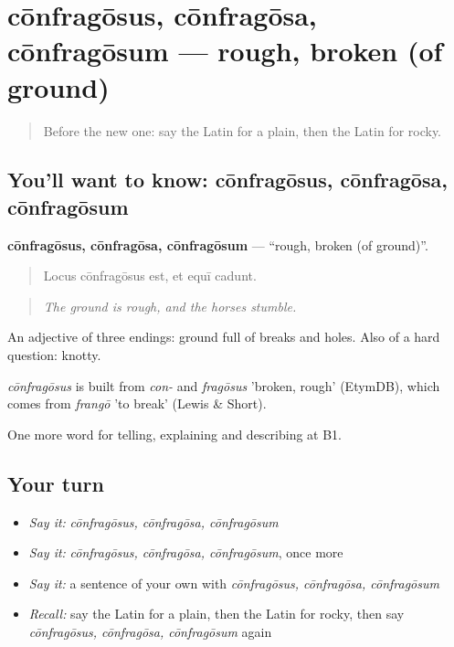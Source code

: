 \section[cōnfragōsus, cōnfragōsa, cōnfragōsum]{cōnfragōsus, cōnfragōsa, cōnfragōsum — rough, broken (of ground)}

\label{lesson:LA-C481-confragosus}



\begin{quote}
Before the new one: say the Latin for a plain, then the Latin for rocky.
\end{quote}

\subsection*{You'll want to know: cōnfragōsus, cōnfragōsa, cōnfragōsum}
\textbf{cōnfragōsus, cōnfragōsa, cōnfragōsum} — \textquotedblleft{}rough, broken (of ground)\textquotedblright{}.

\begin{quote}
Locus cōnfragōsus est, et equī cadunt.
\end{quote}

\begin{quote}
\emph{The ground is rough, and the horses stumble.}
\end{quote}

An adjective of three endings: ground full of breaks and holes. Also of a hard question: knotty.

\begin{cousinweb}
\emph{cōnfragōsus} is built from \emph{con-} and \emph{fragōsus} 'broken, rough' (EtymDB), which comes from \emph{frangō} 'to break' (Lewis \& Short).
\end{cousinweb}

\begin{grammarlens}[title={What you've built}]
One more word for telling, explaining and describing at B1.
\end{grammarlens}

\subsection*{Your turn}
\begin{itemize}
\raggedright
  \item \emph{Say it:} \emph{cōnfragōsus, cōnfragōsa, cōnfragōsum}
  \item \emph{Say it:} \emph{cōnfragōsus, cōnfragōsa, cōnfragōsum}, once more
  \item \emph{Say it:} a sentence of your own with \emph{cōnfragōsus, cōnfragōsa, cōnfragōsum}
  \item \emph{Recall:} say the Latin for a plain, then the Latin for rocky, then say \emph{cōnfragōsus, cōnfragōsa, cōnfragōsum} again
\end{itemize}


